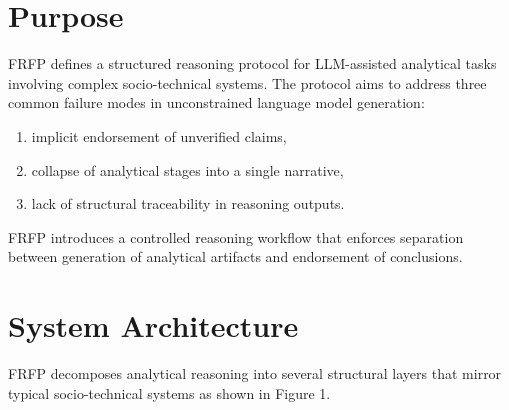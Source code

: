 
\section{Purpose}

FRFP defines a structured reasoning protocol for LLM-assisted analytical tasks involving complex socio-technical systems. The protocol aims to address three common failure modes in unconstrained language model generation:

\begin{enumerate}
\item implicit endorsement of unverified claims,
\item collapse of analytical stages into a single narrative,
\item lack of structural traceability in reasoning outputs.
\end{enumerate}

FRFP introduces a controlled reasoning workflow that enforces separation between generation of analytical artifacts and endorsement of conclusions.
\section{System Architecture}

FRFP decomposes analytical reasoning into several structural layers that mirror typical socio-technical systems as shown in Figure 1.

